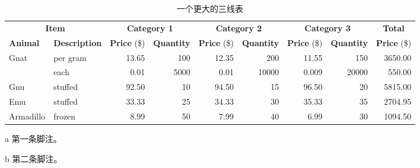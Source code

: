 \begin{table}[!htbp]
    \centering
    \begin{threeparttable}[b]
        \caption{一个更大的三线表}
        \label{tab:bigtable}
        \begin{tabular}{@{}llrrrrrrr@{}} \toprule
            \multicolumn{2}{c}{\textbf{Item}} & \multicolumn{2}{c}{\textbf{Category 1}} & \multicolumn{2}{c}{\textbf{Category 2}} & \multicolumn{2}{c}{\textbf{Category 3}} & \multicolumn{1}{c}{\textbf{Total}}                                                                                     \\ \cmidrule(r){1-2} \cmidrule(lr){3-4} \cmidrule(lr){5-6} \cmidrule(lr){7-8} \cmidrule(l){9-9}
            \textbf{Animal}                   & \textbf{Description}                    & \textbf{Price} (\$)                     & \textbf{Quantity}                       & \textbf{Price} (\$)                & \textbf{Quantity} & \textbf{Price} (\$) & \textbf{Quantity} & \textbf{Price} (\$) \\ \midrule
            Gnat                              & per gram\tnote{a}                       & 13.65                                   & 100                                     & 12.35                              & 200               & 11.55               & 150               & 3650.00             \\
                                              & each                                    & 0.01                                    & 5000                                    & 0.01                               & 10000             & 0.009               & 20000             & 550.00              \\
            Gnu                               & stuffed                                 & 92.50                                   & 10                                      & 94.50                              & 15                & 96.50               & 20                & 5815.00             \\
            Emu                               & stuffed                                 & 33.33                                   & 25                                      & 34.33                              & 30                & 35.33               & 35                & 2704.95             \\
            Armadillo                         & frozen                                  & 8.99                                    & 50                                      & 7.99                               & 40                & 6.99                & 30\tnote{b}       & 1094.50             \\ \bottomrule
        \end{tabular}
        \begin{tablenotes}
            \item [a] 第一条脚注。
            \item [b] 第二条脚注。
        \end{tablenotes}
    \end{threeparttable}
\end{table}

